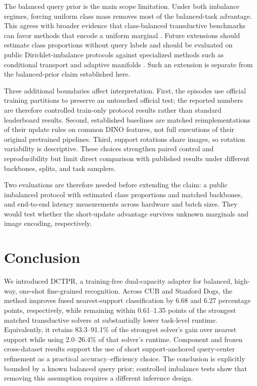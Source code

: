 \documentclass[10pt,twocolumn]{article}
\newcommand{\method}{\textsc{DCTPR}\xspace}
\begin{document}
The balanced query prior is the main scope limitation. Under both imbalance
regimes, forcing uniform class mass removes most of the balanced-task advantage.
This agrees with broader evidence that class-balanced transductive benchmarks
can favor methods that encode a uniform marginal \cite{realistictransduction}.
Future extensions should estimate class proportions without query labels and
should be evaluated on public Dirichlet-imbalance protocols against specialized
methods such as conditional transport and adaptive manifolds
\cite{conditionaltransport,adaptivemanifold}. Such an extension is separate
from the balanced-prior claim established here.

Three additional boundaries affect interpretation. First, the episodes use
official training partitions to preserve an untouched official test; the
reported numbers are therefore controlled train-only protocol results rather
than standard leaderboard results. Second, established baselines are matched
reimplementations of their update rules on common DINO features, not full
executions of their original pretrained pipelines. Third, support rotations
share images, so rotation variability is descriptive. These choices strengthen
paired control and reproducibility but limit direct comparison with published
results under different backbones, splits, and task samplers.

Two evaluations are therefore needed before extending the claim: a public
imbalanced protocol with estimated class proportions and matched backbones, and
end-to-end latency measurements across hardware and batch sizes. They would
test whether the short-update advantage survives unknown marginals and image
encoding, respectively.

\section{Conclusion}
\label{sec:conclusion}

We introduced \method, a training-free dual-capacity adapter for balanced,
high-way, one-shot fine-grained recognition. Across CUB and Stanford Dogs, the
method improves fused nearest-support classification by 6.68 and 6.27
percentage points, respectively, while remaining within 0.61--1.35 points of
the strongest matched transductive solvers at substantially lower task-level
runtime. Equivalently, it retains 83.3--91.1\% of the strongest solver's gain
over nearest support while using 2.0--26.4\% of that solver's runtime.
Component and frozen cross-dataset results support the use of short
support-anchored query-center refinement as a practical accuracy--efficiency
choice. The conclusion is explicitly bounded by a known balanced query prior;
controlled imbalance tests show that removing this assumption requires a
different inference design.
\end{document}
